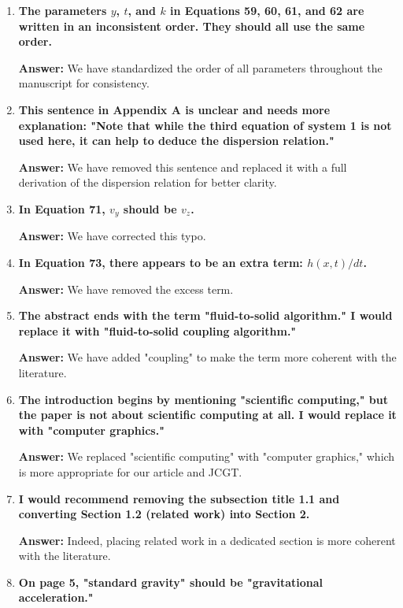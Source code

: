 \documentclass{article}
\newcommand{\answer}[1]{\textbf{\textcolor{answercolor}{Answer:}} \textcolor{answercolor}{#1}}
\begin{document}
\begin{enumerate}[label=\textbf{\arabic*.}]
	      \answer{We have corrected this case mistake.}

	\item \textbf{The parameters $y$, $t$, and $k$ in Equations 59, 60, 61, and 62 are written in an inconsistent order. They should all use the same order.}

	      \answer{We have standardized the order of all parameters throughout the manuscript for consistency.}

	\item \textbf{This sentence in Appendix A is unclear and needs more explanation: "Note that while the third equation of system 1 is not used here, it can help to deduce the dispersion relation."}

	      \answer{We have removed this sentence and replaced it with a full derivation of the dispersion relation for better clarity.}

	\item \textbf{In Equation 71, $v_y$ should be $v_z$.}

	      \answer{We have corrected this typo.}

	\item \textbf{In Equation 73, there appears to be an extra term: $h(x,t)/dt$.}

	      \answer{We have removed the excess term.}

	\item \textbf{The abstract ends with the term "fluid-to-solid algorithm." I would replace it with "fluid-to-solid coupling algorithm."}

	      \answer{We have added "coupling" to make the term more coherent with the literature.}

	\item \textbf{The introduction begins by mentioning "scientific computing," but the paper is not about scientific computing at all. I would replace it with "computer graphics."}

	      \answer{We replaced "scientific computing" with "computer graphics," which is more appropriate for our article and JCGT.}

	\item \textbf{I would recommend removing the subsection title 1.1 and converting Section 1.2 (related work) into Section 2.}

	      \answer{Indeed, placing related work in a dedicated section is more coherent with the literature.}

	\item \textbf{On page 5, "standard gravity" should be "gravitational acceleration."}


\end{enumerate}
\end{document}
